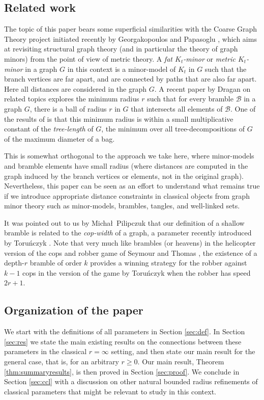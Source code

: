 \documentclass[final]{dmtcs-episciences}
\theoremstyle{definition}
\theoremstyle{remark}
\renewcommand{\geq}{\geqslant}
\begin{document}
\medskip


\subsection*{Related work} The topic of this paper bears some superficial similarities with the Coarse Graph Theory project initiated recently by Georgakopoulos and Papasoglu \cite{GP23}, which aims at revisiting structural graph theory (and in particular the theory of graph minors) from the point of view of metric theory. A \emph{fat $K_t$-minor} or \emph{metric $K_t$-minor} in a graph $G$ in this context is a minor-model of $K_t$ in $G$ such that  the branch vertices are far apart, and are connected by paths that are also far apart. Here all distances are considered in the graph $G$. A recent paper by Dragan \cite{Dra25} on related topics  explores the minimum radius $r$ such that for every bramble $\mathcal{B}$ in a graph $G$, there is a ball of radius $r$ in $G$ that intersects all elements of $\mathcal{B}$. One of the results of \cite{Dra25} is that this minimum radius is within a small multiplicative constant of the \emph{tree-length} of $G$, the minimum over all tree-decompositions of $G$ of the maximum diameter of a bag. 


This is somewhat orthogonal to the approach we take here, where minor-models and bramble elements have small radius (where distances are computed in the graph induced by the branch vertices or elements, not in the original graph). Nevertheless, this paper can be seen as an effort to understand what remains true if we introduce appropriate distance constraints in classical objects from graph minor theory such as minor-models, brambles, tangles, and well-linked sets.

\medskip

It was pointed out to us by Micha\l\ Pilipczuk that our definition of a shallow bramble is related to the \emph{cop-width} of a graph, a parameter recently introduced by Toru\'nczyk \cite{Tor23}. Note that very much like brambles (or heavens) in the helicopter version of the cops and robber game of Seymour and Thomas \cite{ST1993}, the existence of a depth-$r$ bramble of order $k$ provides  a winning strategy for the robber against $k-1$ cops in the version of the game by Toru\'nczyk  when the robber has speed $2r+1$. 

\subsection*{Organization of the paper} We start with the definitions of all parameters in Section \ref{sec:def}. In Section \ref{sec:res} we state the main existing results on the connections between these parameters in the classical $r=\infty$ setting, and then state our main result for the general case, that is, for an arbitrary $r\geq 0$. 
Our main result, Theorem \ref{thm:summaryresults}, is then proved in Section \ref{sec:proof}. We conclude in Section \ref{sec:ccl} with a discussion on other natural bounded radius refinements of classical parameters that might be relevant to study in this context.
\end{document}
